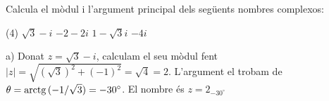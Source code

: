 \begin{mylist}
	\exer[1] Calcula el mòdul i l'argument principal dels següents nombres complexos:
	\begin{tasks}(4)
		\task  $\sqrt{3}-i$
		\task  $-2-2 i$
		\task  $1 - \sqrt{3} i $
		\task  $-4 i$
	\end{tasks}
	\answers[cols=1]{[
			 $|z|=2$;  $arg(z)=-30^\circ$,
			 $|z|=\sqrt{8}$;  $arg(z)=225 = - 135^\circ$,
			 $|z|=2$;  $arg(z)=-60^\circ$,
			 $|z|=4$;  $arg(z)=-90^\circ$]}
	
\end{mylist}
	
	\begin{example}
		a) 
		Donat $z=\sqrt{3}-i$, calculam el seu mòdul fent $|z|=\sqrt{(\sqrt 3)^2+(-1)^2}=\sqrt{4}=2$. L'argument el trobam de $\theta= \mathrm{arctg}\,(-1/\sqrt{3})=-30^\circ$.
		El nombre és $z=2_{-30^\circ}$
	\end{example}
 

